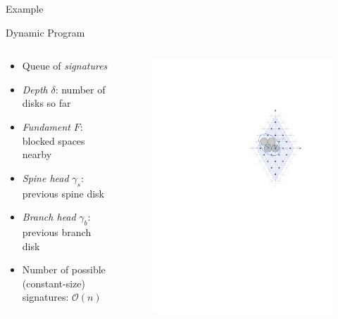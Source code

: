 \documentclass[aspectratio=169,notes]{beamer}
\begin{document}
\begin{frame}{Example}
\end{frame}

\begin{frame}{Dynamic Program}

\begin{columns}
\begin{column}{0.5\textwidth}
    \begin{itemize}
    \item Queue of \emph{signatures}
    \item \emph{Depth} $\delta$: number of disks so far
    \item \emph{Fundament} $F$: blocked spaces nearby
    \item \emph{Spine head} $\gamma_s$: previous spine disk
    \item \emph{Branch head} $\gamma_b$: previous branch disk
    \item Number of possible (constant-size) signatures: $\mathcal O(n)$
    \end{itemize}
\end{column}
\begin{column}{0.4\textwidth}
\begin{figure}
    \centering
    \includegraphics[width=.7\textwidth]{ch4_partialproblem_1.pdf}
\end{figure}
\end{column}
\end{columns}

\end{frame}
\end{document}
